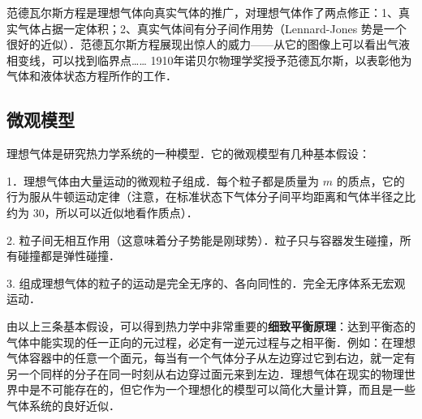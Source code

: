 范德瓦尔斯方程是理想气体向真实气体的推广，对理想气体作了两点修正：1、真实气体占据一定体积；2、真实气体间有分子间作用势（Lennard-Jones 势是一个很好的近似）．范德瓦尔斯方程展现出惊人的威力——从它的图像上可以看出气液相变线，可以找到临界点…… 1910年诺贝尔物理学奖授予范德瓦尔斯，以表彰他为气体和液体状态方程所作的工作．

\subsection{微观模型}

理想气体是研究热力学系统的一种模型．它的微观模型有几种基本假设：

1．理想气体由大量运动的微观粒子组成．每个粒子都是质量为 $m$ 的质点，它的行为服从牛顿运动定律（注意，在标准状态下气体分子间平均距离和气体半径之比约为 $30$，所以可以近似地看作质点）．

2. 粒子间无相互作用（这意味着分子势能是刚球势）．粒子只与容器发生碰撞，所有碰撞都是弹性碰撞．

3. 组成理想气体的粒子的运动是完全无序的、各向同性的．完全无序体系无宏观运动．

由以上三条基本假设，可以得到热力学中非常重要的\textbf{细致平衡原理}：达到平衡态的气体中能实现的任一正向的元过程，必定有一逆元过程与之相平衡．例如：在理想气体容器中的任意一个面元，每当有一个气体分子从左边穿过它到右边，就一定有另一个同样的分子在同一时刻从右边穿过面元来到左边．理想气体在现实的物理世界中是不可能存在的，但它作为一个理想化的模型可以简化大量计算，而且是一些气体系统的良好近似．
